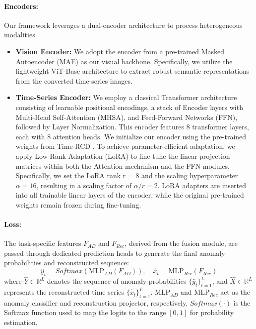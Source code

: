\documentclass{article}
\theoremstyle{plain}
\theoremstyle{definition}
\theoremstyle{remark}
\begin{document}
\paragraph{Encoders:} Our framework leverages a dual-encoder architecture to process heterogeneous modalities.
\begin{itemize}
\item \textbf{Vision Encoder:} We adopt the encoder from a pre-trained Masked Autoencoder (MAE) as our visual backbone. Specifically, we utilize the lightweight ViT-Base architecture to extract robust semantic representations from the converted time-series images.
\item \textbf{Time-Series Encoder:} We employ a classical Transformer architecture consisting of learnable positional encodings, a stack of Encoder layers with Multi-Head Self-Attention (MHSA), and Feed-Forward Networks (FFN), followed by Layer Normalization. This encoder features 8 transformer layers, each with 8 attention heads. We initialize our encoder using the pre-trained weights from Time-RCD \cite{lan2025foundationmodelszeroshottime}.
To achieve parameter-efficient adaptation, we apply Low-Rank Adaptation (LoRA) to fine-tune the linear projection matrices within both the Attention mechanism and the FFN modules. Specifically, we set the LoRA rank r = 8 and the scaling hyperparameter $\alpha = 16$, resulting in a scaling factor of $\alpha/r = 2$. LoRA adapters are inserted into all trainable linear layers of the encoder, while the original pre-trained weights remain frozen during fine-tuning.
\end{itemize}


\paragraph{Loss:} \label{appx.loss}
The task-specific features $F_{AD}$ and $F_{Rec}$, derived from the fusion module, are passed through dedicated prediction heads to generate the final anomaly probabilities and reconstructed sequence:
\begin{equation}
\hat{y}_t = Softmax(\text{MLP}_{AD}(F_{AD})), \quad \hat{x}_t = \text{MLP}_{Rec}(F_{Rec})
\end{equation}
where $\hat{Y} \in \mathbb{R}^{L}$ denotes the sequence of anomaly probabilities $\{\hat{y}_t\}_{t=1}^{L}$, and $\hat{X} \in \mathbb{R}^{L}$ represents the reconstructed time series $\{\hat{x}_t\}_{t=1}^{L}$. $\text{MLP}_{AD}$ and $\text{MLP}_{Rec}$ act as the anomaly classifier and reconstruction projector, respectively. $Softmax(\cdot)$ is the Softmax function used to map the logits to the range $[0,1]$ for probability estimation.
\end{document}
